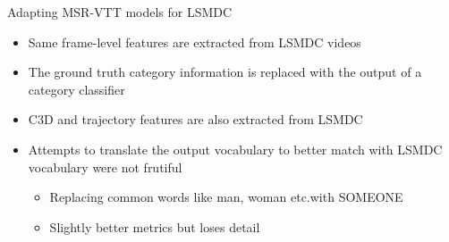\documentclass{beamer}
\begin{document}
\begin{frame}{Adapting MSR-VTT models for LSMDC}
    \begin{itemize}
        \item Same frame-level features are extracted from LSMDC videos
        \item The ground truth category information is replaced with the output of a category classifier
        \item C3D and trajectory features are also extracted from LSMDC
        \item Attempts to translate the output vocabulary to better match with LSMDC vocabulary were not frutiful
           \begin{itemize}
               \item Replacing common words like man, woman etc.\@ with SOMEONE
               \item Slightly better metrics but loses detail
           \end{itemize}
    \end{itemize}
\end{frame}
\end{document}
